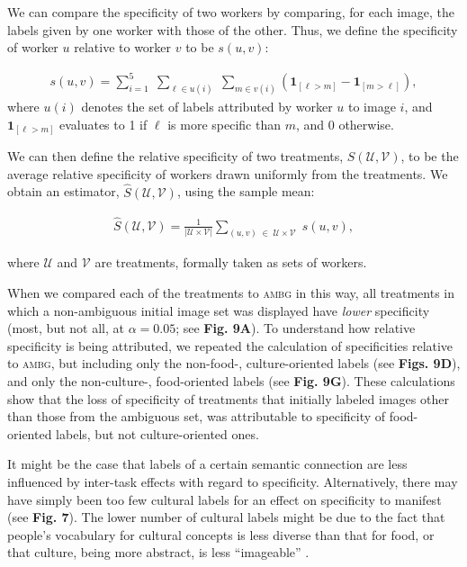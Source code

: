 \documentclass[a4paper]{report}
\begin{document}
We can compare the specificity of two workers by comparing, for each image,
the labels given by one worker with those of the other.  Thus, we define the
specificity of worker $u$ relative to worker $v$ to be $s(u,v)$:

\begin{align}
	s(u,v) = \sum_{i=1}^5 \;
	\sum_{\ell \in u(i) } \;
	\sum_{m \in v(i)} 
	\left(\mathbf{1}_{[\ell > m]} - \mathbf{1}_{[m>\ell]}\right),
	\label{eq:worker-specificity}
\end{align}
where $u(i)$ denotes the set of labels attributed by worker $u$ to image $i$, 
and $\mathbf{1}_{[\ell > m]}$ evaluates to 1 if $\ell$ is more specific than 
$m$, and 0 otherwise.

We can then define the relative specificity of two treatments, 
$S(\mathcal{U},\mathcal{V})$, to be the average
relative specificity of workers drawn uniformly from the treatments.  
We obtain an estimator, $\hat{S}({\mathcal{U}, \mathcal{V}})$, using the 
sample mean:

\begin{align}
	\hat{S}(\mathcal{U},\mathcal{V}) = 
	\frac{1}{|\mathcal{U} \times \mathcal{V}|}
	\sum_{(u,v) \; \in \; \mathcal{U} \times \mathcal{V}} \;
		s(u,v),
		\label{eq:specificity}
\end{align}

where $\mathcal{U}$ and $\mathcal{V}$ are treatments, formally taken
as sets of workers.

When we compared each of the treatments to \textsc{ambg} in this way, 
all treatments in which a non-ambiguous initial image set was 
displayed have \textit{lower} specificity 
(most, but not all, at $\alpha=0.05$; see \textbf{Fig. 9A}).  To understand
how relative specificity is being attributed, we repeated the calculation of 
specificities relative to \textsc{ambg}, but including only the non-food-, culture-oriented 
labels (see \textbf{Figs. 9D}), and only the non-culture-, food-oriented labels
(see \textbf{Fig. 9G}).  These calculations show that the loss of 
specificity of treatments that initially labeled images other than those from
the ambiguous set, was attributable to specificity of food-oriented labels, 
but not culture-oriented ones.  

It might be the case that labels of a certain semantic connection are less 
influenced by inter-task effects with regard to specificity. Alternatively,
there may have simply been too few cultural labels for an effect on specificity
to manifest (see \textbf{Fig. 7}).
The lower number of cultural labels might be due to the fact that people's 
vocabulary for cultural concepts is less diverse than that for food, or that 
culture, being more abstract, is less ``imageable'' \cite{Swaab200299}.
\end{document}
